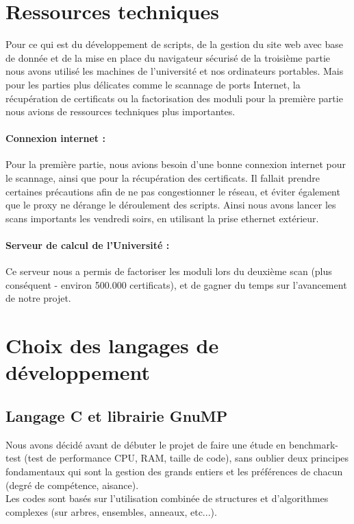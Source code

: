 \section{Ressources techniques}

Pour ce qui est du développement de scripts, de la gestion du site web avec base de donnée et de la mise en place du navigateur sécurisé de la troisième partie nous avons utilisé les machines de l'université et nos ordinateurs portables. Mais pour les parties plus délicates comme le scannage de ports Internet, la récupération de certificats ou la factorisation des moduli pour la première partie nous avions de ressources techniques plus importantes.

\paragraph{Connexion internet : } Pour la première partie, nous avions besoin d'une bonne connexion internet pour le scannage, ainsi que pour la récupération des certificats. Il fallait prendre certaines précautions afin de ne pas congestionner le réseau, et éviter également que le proxy ne dérange le déroulement des scripts. Ainsi nous avons lancer les scans importants les vendredi soirs, en utilisant la prise ethernet extérieur.

\paragraph{Serveur de calcul de l'Université :} Ce serveur nous a permis de factoriser les moduli lors du deuxième scan (plus conséquent - environ 500.000 certificats), et de gagner du temps sur l'avancement de notre projet.

\section{Choix des langages de développement}

\subsection{Langage C et librairie GnuMP}

Nous avons décidé avant de débuter le projet de faire une étude en benchmark-test \cite{chooseprogram2013} \cite{marceau2009program} \cite{udemypng} (test de performance CPU, RAM, taille de code), sans oublier deux principes fondamentaux qui sont la gestion des grands entiers et les préférences de chacun (degré de compétence, aisance).\\
Les codes sont basés sur l'utilisation combinée de structures et d'algorithmes complexes (sur arbres, ensembles, anneaux, etc...).\\

